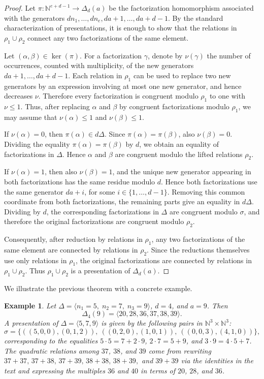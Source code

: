 \documentclass[12pt,a4paper]{amsart}
\newtheorem{example}[theorem]{Example}
\theoremstyle{definition}
\theoremstyle{remark}
\begin{document}
\begin{proof}
Let \(\pi:\mathbb{N}^{e+d-1}\to\Delta_d(a)\) be the factorization homomorphism associated with the generators $dn_1,\dots,dn_e,da+1,\dots,da+d-1$. By the standard characterization of presentations, it is enough to show that the relations in \(\rho_1\cup\rho_2\) connect any two factorizations of the same element.

Let \((\alpha,\beta)\in\ker(\pi)\). For a factorization \(\gamma\), denote by \(\nu(\gamma)\) the number of occurrences, counted with multiplicity, of the new generators \(da+1,\dots,da+d-1\). Each relation in \(\rho_1\) can be used to replace two new generators by an expression involving at most one new generator, and hence decreases \(\nu\). Therefore every factorization is congruent modulo \(\rho_1\) to one with \(\nu\le1\). Thus, after replacing \(\alpha\) and \(\beta\) by congruent factorizations modulo \(\rho_1\), we may assume that \(\nu(\alpha)\le1\) and \(\nu(\beta)\le1\).

If \(\nu(\alpha)=0\), then \(\pi(\alpha)\in d\Delta\). Since
\(\pi(\alpha)=\pi(\beta)\), also \(\nu(\beta)=0\). Dividing the equality \(\pi(\alpha)=\pi(\beta)\) by \(d\), we obtain an equality of factorizations in \(\Delta\). Hence \(\alpha\) and \(\beta\) are congruent modulo the lifted relations \(\rho_2\).

If \(\nu(\alpha)=1\), then also \(\nu(\beta)=1\), and the unique new generator appearing  in both factorizations has the same residue modulo \(d\). Hence both factorizations use the same generator \(da+i\), for some \(i\in\{1,\dots,d-1\}\). Removing this common coordinate from both factorizations, the remaining parts give an equality in \(d\Delta\). Dividing by \(d\), the corresponding factorizations in \(\Delta\) are congruent modulo \(\sigma\), and therefore the original factorizations are congruent modulo \(\rho_2\).

Consequently, after reduction by relations in \(\rho_1\), any two factorizations of the same element are connected by relations in \(\rho_2\). Since the reductions themselves use only relations in \(\rho_1\), the original factorizations are connected by relations
in \(\rho_1\cup\rho_2\). Thus \(\rho_1\cup\rho_2\) is a presentation of \(\Delta_d(a)\).
\end{proof}

We illustrate the previous theorem with a concrete example.

\begin{example}
Let $\Delta=\langle n_1=5,\; n_2=7,\; n_3=9\rangle$, $d=4$, and $a=9$. Then
\[
\Delta_4(9)=\langle 20,28,36,37,38,39\rangle.
\]
A presentation of $\Delta=\langle 5,7,9\rangle$ is given by the following pairs in $\mathbb{N}^3\times\mathbb{N}^3$:
\[
\sigma=\{((5,0,0),(0,1,2)),\ ((0,2,0),(1,0,1)),\ ((0,0,3),(4,1,0))\},
\]
corresponding to the equalities $5\cdot 5=7+2\cdot 9$, $2\cdot 7=5+9$, and $3\cdot 9=4\cdot 5+7$. 
The quadratic relations among $37$, $38$, and $39$ come from rewriting $37+37,\,37+38,\,37+39,\,38+38,\,38+39,$ and $39+39$ via the identities in the text and expressing the multiples $36$ and $40$
in terms of $20$, $28$, and $36$.
\end{example}
\end{document}
